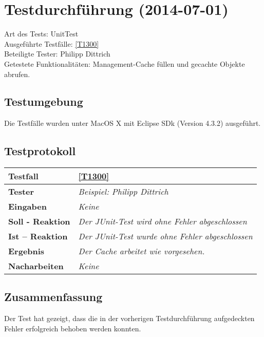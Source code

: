 
\chapter{Testdurchführung (2014-07-01)}

Art des Tests: UnitTest\\
Ausgeführte Testfälle: \ref{T1300}\\ 
Beteiligte Tester: Philipp Dittrich\\
Getestete Funktionalitäten: Management-Cache füllen und gecachte Objekte
abrufen.

\section{Testumgebung}

Die Testfälle wurden unter MacOS X mit Eclipse SDk (Version 4.3.2) ausgeführt.

\section{Testprotokoll}

\begin{longtable}{|p{4cm}|p{11cm}|}
\hline
\textbf{Testfall} & \ref{T1300} \\
\hline
\textbf{Tester} & \textit{Beispiel: Philipp Dittrich} \\
\hline
\textbf{Eingaben} & \textit{Keine} \\
\hline
\textbf{Soll - Reaktion} & \textit{Der JUnit-Test wird ohne Fehler
abgeschlossen }
\\
\hline
\textbf{Ist -- Reaktion} & \textit{Der JUnit-Test wurde ohne Fehler
abgeschlossen}
\\
\hline
\textbf{Ergebnis} & \textit{Der Cache arbeitet wie vorgesehen.} \\
\hline
\textbf{Nacharbeiten } & \textit{Keine} \\
\hline
\end{longtable}

\section{Zusammenfassung}

Der Test hat gezeigt, dass die in der vorherigen Testdurchführung aufgedeckten
Fehler erfolgreich behoben werden konnten.
